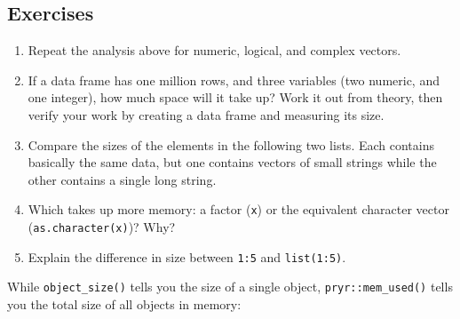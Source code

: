 \subsection{Exercises}

\begin{enumerate}
\def\labelenumi{\arabic{enumi}.}
\item
  Repeat the analysis above for numeric, logical, and complex vectors.
\item
  If a data frame has one million rows, and three variables (two
  numeric, and one integer), how much space will it take up? Work it out
  from theory, then verify your work by creating a data frame and
  measuring its size.
\item
  Compare the sizes of the elements in the following two lists. Each
  contains basically the same data, but one contains vectors of small
  strings while the other contains a single long string.

\begin{Shaded}
\begin{Highlighting}[]
\StringTok{ }\NormalTok{(}\NormalTok{:}\NormalTok{(}\NormalTok{, }\NormalTok{(}
\StringTok{ } \NormalTok{)}
\end{Highlighting}
\end{Shaded}
\item
  Which takes up more memory: a factor (\texttt{x}) or the equivalent
  character vector (\texttt{as.character(x)})? Why?
\item
  Explain the difference in size between \texttt{1:5} and
  \texttt{list(1:5)}.
\end{enumerate}


While \texttt{object\_size()} tells you the size of a single object,
\texttt{pryr::mem\_used()} tells you the total size of all objects in
memory: 

\begin{Shaded}
\begin{Highlighting}[]
\NormalTok{()}
\end{Highlighting}
\end{Shaded}

